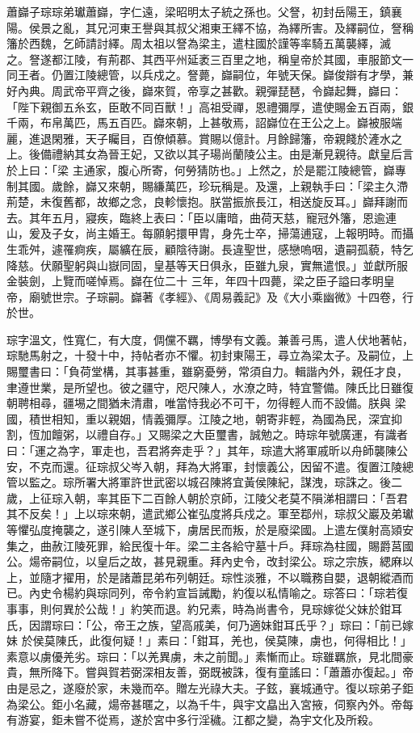 \begin{pinyinscope}
 蕭巋子琮琮弟瓛蕭巋，字仁遠，梁昭明太子統之孫也。父詧，初封岳陽王，鎮襄陽。侯景之亂，其兄河東王譽與其叔父湘東王繹不協，為繹所害。及繹嗣位，詧稱籓於西魏，乞師請討繹。周太祖以詧為梁主，遣柱國於謹等率騎五萬襲繹，滅
 之。詧遂都江陵，有荊郡、其西平州延袤三百里之地，稱皇帝於其國，車服節文一同王者。仍置江陵總管，以兵戍之。詧薨，巋嗣位，年號天保。巋俊辯有才學，兼好內典。周武帝平齊之後，巋來賀，帝享之甚歡。親彈琵琶，令巋起舞，巋曰：「陛下親御五糸玄，臣敢不同百獸！」高祖受禪，恩禮彌厚，遣使賜金五百兩，銀千兩，布帛萬匹，馬五百匹。巋來朝，上甚敬焉，詔巋位在王公之上。巋被服端麗，進退閑雅，天子矚目，百僚傾慕。賞賜以億計。月餘歸籓，帝親餞於滻水之上。後備禮納其女為晉王妃，又欲以其子瑒尚蘭陵公主。由是漸見親待。獻皇后言於上曰：「梁
 主通家，腹心所寄，何勞猜防也。」上然之，於是罷江陵總管，巋專制其國。歲餘，巋又來朝，賜縑萬匹，珍玩稱是。及還，上親執手曰：「梁主久滯荊楚，未復舊都，故鄉之念，良軫懷抱。朕當振旅長江，相送旋反耳。」巋拜謝而去。其年五月，寢疾，臨終上表曰：「臣以庸暗，曲荷天慈，寵冠外籓，恩逾連山，爰及子女，尚主婚王。每願躬擐甲胄，身先士卒，掃蕩逋寇，上報明時。而攝生乖舛，遽罹痾疾，屬纊在辰，顧陰待謝。長違聖世，感戀嗚咽，遺嗣孤藐，特乞降慈。伏願聖躬與山嶽同固，皇基等天日俱永，臣雖九泉，實無遣恨。」並獻所服金裝劍，上覽而嗟悼焉。巋在位二十
 三年，年四十四薨，梁之臣子謚曰孝明皇帝，廟號世宗。子琮嗣。巋著《孝經》、《周易義記》及《大小乘幽微》十四卷，行於世。



 琮字溫文，性寬仁，有大度，倜儻不羈，博學有文義。兼善弓馬，遣人伏地著帖，琮馳馬射之，十發十中，持帖者亦不懼。初封東陽王，尋立為梁太子。及嗣位，上賜璽書曰：「負荷堂構，其事甚重，雖窮憂勞，常須自力。輯諧內外，親任才良，聿遵世業，是所望也。彼之疆守，咫尺陳人，水潦之時，特宜警備。陳氏比日雖復朝聘相尋，疆埸之間猶未清肅，唯當恃我必不可干，勿得輕人而不設備。朕與
 梁國，積世相知，重以親姻，情義彌厚。江陵之地，朝寄非輕，為國為民，深宜抑割，恆加饘粥，以禮自存。」又賜梁之大臣璽書，誠勉之。時琮年號廣運，有識者曰：「運之為字，軍走也，吾君將奔走乎？」其年，琮遣大將軍戚昕以舟師襲陳公安，不克而還。征琮叔父岑入朝，拜為大將軍，封懷義公，因留不遣。復置江陵總管以監之。琮所署大將軍許世武密以城召陳將宜黃侯陳紀，謀洩，琮誅之。後二歲，上征琮入朝，率其臣下二百餘人朝於京師，江陵父老莫不隕涕相謂曰：「吾君其不反矣！」上以琮來朝，遣武鄉公崔弘度將兵戍之。軍至鄀州，琮叔父巖及弟瓛
 等懼弘度掩襲之，遂引陳人至城下，虜居民而叛，於是廢梁國。上遣左僕射高熲安集之，曲赦江陵死罪，給民復十年。梁二主各給守墓十戶。拜琮為柱國，賜爵莒國公。煬帝嗣位，以皇后之故，甚見親重。拜內史令，改封梁公。琮之宗族，緦麻以上，並隨才擢用，於是諸蕭昆弟布列朝廷。琮性淡雅，不以職務自嬰，退朝縱酒而已。內史令楊約與琮同列，帝令約宣旨誡勵，約復以私情喻之。琮答曰：「琮若復事事，則何異於公哉！」約笑而退。約兄素，時為尚書令，見琮嫁從父妹於鉗耳氏，因謂琮曰：「公，帝王之族，望高戚美，何乃適妹鉗耳氏乎？」琮曰：「前已嫁妹
 於侯莫陳氏，此復何疑！」素曰：「鉗耳，羌也，侯莫陳，虜也，何得相比！」素意以虜優羌劣。琮曰：「以羌異虜，未之前聞。」素慚而止。琮雖羈旅，見北間豪貴，無所降下。嘗與賀若弼深相友善，弼既被誅，復有童謠曰：「蕭蕭亦復起。」帝由是忌之，遂廢於家，未幾而卒。贈左光祿大夫。子鉉，襄城通守。復以琮弟子鉅為梁公。鉅小名藏，煬帝甚暱之，以為千牛，與宇文皛出入宮掖，伺察內外。帝每有游宴，鉅未嘗不從焉，遂於宮中多行淫穢。江都之變，為宇文化及所殺。




\end{pinyinscope}
